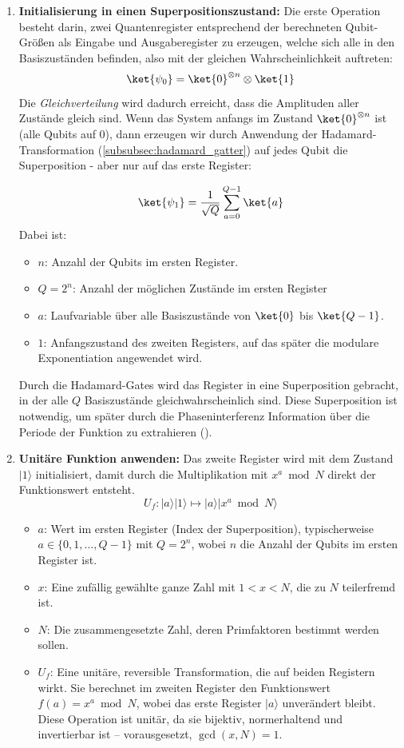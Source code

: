 \begin{enumerate}
    \item \textbf{Initialisierung in einen Superpositionszustand:} 
    Die erste Operation besteht darin, zwei Quantenregister entsprechend der berechneten Qubit-Größen als Eingabe und Ausgaberegister zu erzeugen, welche sich alle in den Basiszuständen befinden, also mit der gleichen Wahrscheinlichkeit auftreten:
\[
\ket{\psi_0} = \ket{0}^{\otimes n} \otimes \ket{1}
\]
    Die \textit{Gleichverteilung} wird dadurch erreicht, dass die Amplituden aller Zustände gleich sind. Wenn das System anfangs im Zustand $\ket{0}^{\otimes n}$ ist (alle Qubits auf 0), dann erzeugen wir durch Anwendung der Hadamard-Transformation (\ref{subsubsec:hadamard_gatter}) auf jedes Qubit die Superposition - aber nur auf das erste Register:

$$
\ket{\psi_1} = \frac{1}{\sqrt{Q}} \sum_{a=0}^{Q-1} \ket{a}
$$
Dabei ist:
  \begin{itemize}
    \item \( n \): Anzahl der Qubits im ersten Register.
    \item \( Q = 2^n \): Anzahl der möglichen Zustände im ersten Register
    \item \( a \): Laufvariable über alle Basiszustände von \( \ket{0} \) bis \( \ket{Q-1} \).
    \item \( 1 \): Anfangszustand des zweiten Registers, auf das später die modulare Exponentiation angewendet wird.
  \end{itemize}

  Durch die Hadamard-Gates wird das Register in eine Superposition gebracht, in der alle \( Q \) Basiszustände gleichwahrscheinlich sind. Diese Superposition ist notwendig, um später durch die Phaseninterferenz Information über die Periode der Funktion zu extrahieren (\cite[15-16]{shor_polynomial-time_1994}).\\
 \item \textbf{Unitäre Funktion anwenden:} 
  Das zweite Register wird mit dem Zustand \( |1\rangle \) initialisiert, damit durch die Multiplikation mit \( x^a \bmod N \) direkt der Funktionswert entsteht.
\[
U_f \colon |a\rangle|1\rangle \mapsto |a\rangle|x^a \bmod N\rangle
\]
\begin{itemize}
    \item \textbf{\( a \)}: Wert im ersten Register (Index der Superposition), typischerweise \( a \in \{0, 1, \dotsc, Q-1\} \) mit \( Q = 2^n \), wobei \( n \) die Anzahl der Qubits im ersten Register ist.
    \item \textbf{\( x \)}: Eine zufällig gewählte ganze Zahl mit \( 1 < x < N \), die zu \( N \) teilerfremd ist.
    \item \textbf{\( N \)}: Die zusammengesetzte Zahl, deren Primfaktoren bestimmt werden sollen.
    \item \textbf{\( U_f \)}: Eine unitäre, reversible Transformation, die auf beiden Registern wirkt. Sie berechnet im zweiten Register den Funktionswert \( f(a) = x^a \bmod N \), wobei das erste Register \( |a\rangle \) unverändert bleibt. Diese Operation ist unitär, da sie bijektiv, normerhaltend und invertierbar ist – vorausgesetzt, \( \gcd(x, N) = 1 \).
\end{itemize}


\end{enumerate}
